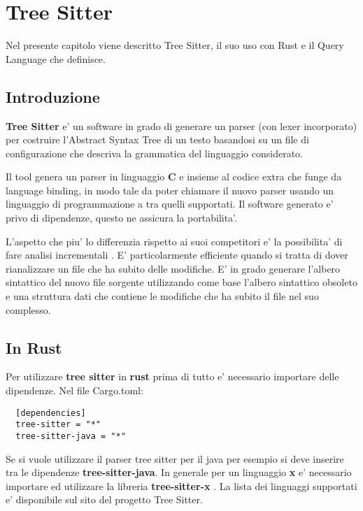 \chapter{Tree Sitter}

Nel presente capitolo viene descritto Tree Sitter, il suo uso con Rust e il Query Language che definisce.

\section{Introduzione}

\textbf{Tree Sitter} \cite{TreeSitter} e' un software in grado di generare un parser (con lexer incorporato) per costruire l'Abstract Syntax Tree di un testo basandosi su un file di configurazione che descriva la grammatica del linguaggio considerato.

Il tool \cite{TreeSitterCreatingParsers} genera un parser in linguaggio \textbf{C} e insieme al codice extra che funge da language binding, in modo tale da poter chiamare il nuovo parser usando un linguaggio di programmazione a tra quelli supportati.
Il software generato e' privo di dipendenze, questo ne assicura la portabilita'.

L'aspetto che piu' lo differenzia rispetto ai suoi competitori e' la possibilita' di fare analisi incrementali \cite{TreeSitterAdvancedParsing}.
E' particolarmente efficiente quando si tratta di dover rianalizzare un file che ha subito delle modifiche.
E' in grado generare l'albero sintattico del nuovo file sorgente utilizzando come base l'albero sintattico obsoleto e una struttura dati che contiene le modifiche che ha subito il file nel suo complesso.

\section{In Rust}

Per utilizzare \textbf{tree sitter} in \textbf{rust} \cite{TreeSitterCrate} prima di tutto e' necessario importare delle dipendenze. Nel file Cargo.toml:

\begin{lstlisting}
  [dependencies]
  tree-sitter = "*"
  tree-sitter-java = "*"
\end{lstlisting}

Se si vuole utilizzare il parser tree sitter per il java per esempio si deve inserire tra le dipendenze \textbf{tree-sitter-java}.
In generale per un linguaggio \textbf{x} e' necessario importare ed utilizzare la libreria \textbf{tree-sitter-x} \cite{TreeSitterRustGrammars}.
La lista dei linguaggi supportati e' disponibile sul sito del progetto Tree Sitter.

